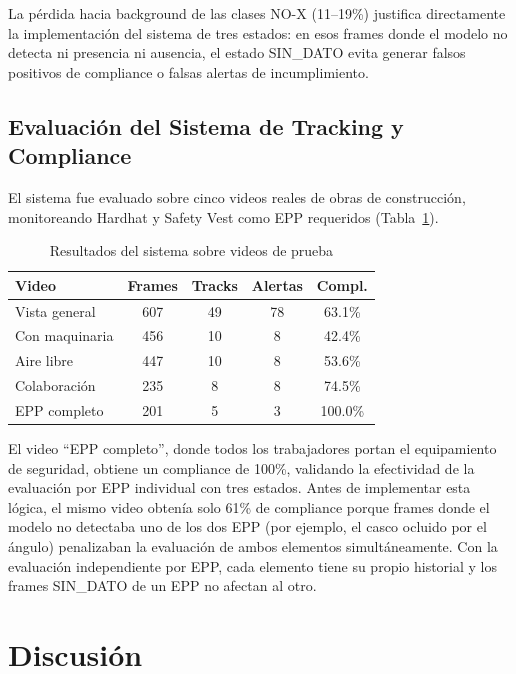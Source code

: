 \documentclass[conference, 10pt]{IEEEtran}
\begin{document}
La pérdida hacia background de las clases NO-X (11--19\%) justifica directamente la implementación del sistema de tres estados: en esos frames donde el modelo no detecta ni presencia ni ausencia, el estado SIN\_DATO evita generar falsos positivos de compliance o falsas alertas de incumplimiento.

\subsection{Evaluación del Sistema de Tracking y Compliance}

El sistema fue evaluado sobre cinco videos reales de obras de construcción, monitoreando Hardhat y Safety Vest como EPP requeridos (Tabla~\ref{tab:demo}).

\begin{table}[h]
\centering
\caption{Resultados del sistema sobre videos de prueba}
\label{tab:demo}
\begin{tabular}{@{}lcccc@{}}
\toprule
\textbf{Video} & \textbf{Frames} & \textbf{Tracks} & \textbf{Alertas} & \textbf{Compl.} \\
\midrule
Vista general     & 607 & 49 & 78 & 63.1\% \\
Con maquinaria    & 456 & 10 & 8  & 42.4\%  \\
Aire libre        & 447 & 10 & 8  & 53.6\%  \\
Colaboración      & 235 & 8  & 8  & 74.5\% \\
EPP completo      & 201 & 5  & 3  & 100.0\% \\
\bottomrule
\end{tabular}
\end{table}

El video ``EPP completo'', donde todos los trabajadores portan el equipamiento de seguridad, obtiene un compliance de 100\%, validando la efectividad de la evaluación por EPP individual con tres estados. Antes de implementar esta lógica, el mismo video obtenía solo 61\% de compliance porque frames donde el modelo no detectaba uno de los dos EPP (por ejemplo, el casco ocluido por el ángulo) penalizaban la evaluación de ambos elementos simultáneamente. Con la evaluación independiente por EPP, cada elemento tiene su propio historial y los frames SIN\_DATO de un EPP no afectan al otro.

\section{Discusión}
\end{document}
